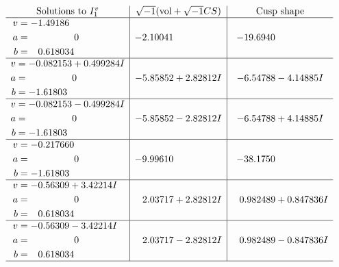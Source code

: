 \documentclass[1p]{elsarticle_modified}
\theoremstyle{definition}
\newcommand{\I}{\sqrt{-1}}
\begin{document}
$$\begin{array}{c|c|c}  
\text{Solutions to }I^v_{1}& \I (\text{vol} + \sqrt{-1}CS) & \text{Cusp shape}\\
 \hline 
\begin{aligned}
v &= -1.49186\phantom{ +0.000000I} \\
a &= \phantom{-0.000000 } 0 \\
b &= \phantom{-}0.618034\phantom{ +0.000000I}\end{aligned}
 & -2.10041\phantom{ +0.000000I} & -19.6940\phantom{ +0.000000I} \\ \hline\begin{aligned}
v &= -0.082153 + 0.499284 I \\
a &= \phantom{-0.000000 } 0 \\
b &= -1.61803\phantom{ +0.000000I}\end{aligned}
 & -5.85852 + 2.82812 I & -6.54788 - 4.14885 I \\ \hline\begin{aligned}
v &= -0.082153 - 0.499284 I \\
a &= \phantom{-0.000000 } 0 \\
b &= -1.61803\phantom{ +0.000000I}\end{aligned}
 & -5.85852 - 2.82812 I & -6.54788 + 4.14885 I \\ \hline\begin{aligned}
v &= -0.217660\phantom{ +0.000000I} \\
a &= \phantom{-0.000000 } 0 \\
b &= -1.61803\phantom{ +0.000000I}\end{aligned}
 & -9.99610\phantom{ +0.000000I} & -38.1750\phantom{ +0.000000I} \\ \hline\begin{aligned}
v &= -0.56309 + 3.42214 I \\
a &= \phantom{-0.000000 } 0 \\
b &= \phantom{-}0.618034\phantom{ +0.000000I}\end{aligned}
 & \phantom{-}2.03717 + 2.82812 I & \phantom{-}0.982489 + 0.847836 I \\ \hline\begin{aligned}
v &= -0.56309 - 3.42214 I \\
a &= \phantom{-0.000000 } 0 \\
b &= \phantom{-}0.618034\phantom{ +0.000000I}\end{aligned}
 & \phantom{-}2.03717 - 2.82812 I & \phantom{-}0.982489 - 0.847836 I\\
 \hline 
 \end{array}$$\newpage
\end{document}

